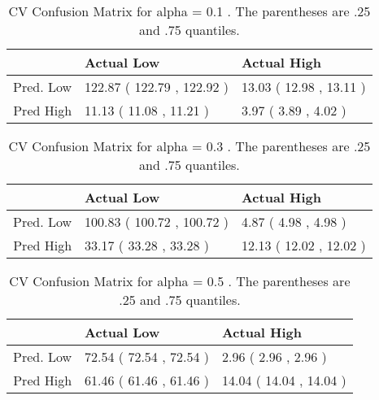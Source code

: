 \begin{table}[H]
\begin{center}
\begin{tabular}{rll}
  \hline
 & Actual Low & Actual High \\ 
  \hline
Pred. Low & 122.87 ( 122.79 , 122.92 ) & 13.03 ( 12.98 , 13.11 ) \\ 
  Pred High & 11.13 ( 11.08 , 11.21 ) & 3.97 ( 3.89 , 4.02 ) \\ 
   \hline
\end{tabular}
\caption{CV Confusion Matrix for alpha = 0.1 . The parentheses are .25 and .75 quantiles.}
\end{center}
\end{table}
\begin{table}[H]
\begin{center}
\begin{tabular}{rll}
  \hline
 & Actual Low & Actual High \\ 
  \hline
Pred. Low & 100.83 ( 100.72 , 100.72 ) & 4.87 ( 4.98 , 4.98 ) \\ 
  Pred High & 33.17 ( 33.28 , 33.28 ) & 12.13 ( 12.02 , 12.02 ) \\ 
   \hline
\end{tabular}
\caption{CV Confusion Matrix for alpha = 0.3 . The parentheses are .25 and .75 quantiles.}
\end{center}
\end{table}
\begin{table}[H]
\begin{center}
\begin{tabular}{rll}
  \hline
 & Actual Low & Actual High \\ 
  \hline
Pred. Low & 72.54 ( 72.54 , 72.54 ) & 2.96 ( 2.96 , 2.96 ) \\ 
  Pred High & 61.46 ( 61.46 , 61.46 ) & 14.04 ( 14.04 , 14.04 ) \\ 
   \hline
\end{tabular}
\caption{CV Confusion Matrix for alpha = 0.5 . The parentheses are .25 and .75 quantiles.}
\end{center}
\end{table}
